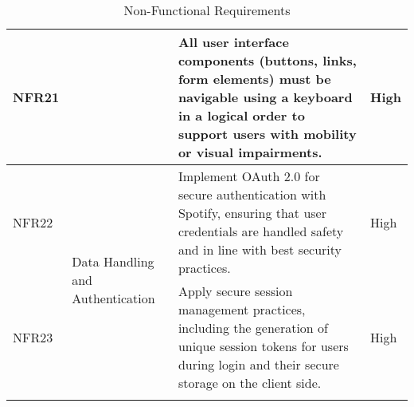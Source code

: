 \begin{longtable}{ |m{1.5cm}|m{3.5cm}|m{7cm}|m{1.5cm}| }
    \cline{1-1} \cline{3-4}
    NFR21 &  & All user interface components (buttons, links, form elements) must be navigable using a keyboard in a logical order to support users with mobility or visual impairments. & High \\
    \hline
    NFR22 & \multirow{2}{=}{Data Handling and Authentication} & Implement OAuth 2.0 for secure authentication with Spotify, ensuring that user credentials are handled safety and in line with best security practices. & High \\
    \cline{1-1} \cline{3-4}
    NFR23 &  & Apply secure session management practices, including the generation of unique session tokens for users during login and their secure storage on the client side. & High \\
    \hline
    \caption{Non-Functional Requirements} \\
\end{longtable}

